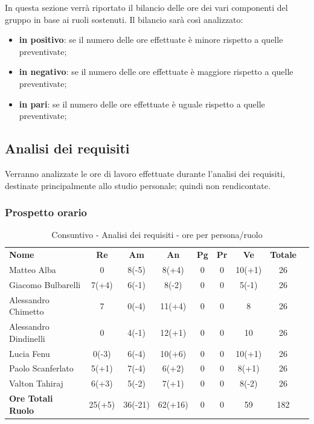 
In questa sezione verrà riportato il bilancio delle ore dei vari componenti del gruppo in base ai ruoli sostenuti. Il bilancio sarà così analizzato:
\begin{itemize}
	\item {\bfseries in positivo}: se il numero delle ore effettuate è minore rispetto a quelle preventivate;
	\item {\bfseries in negativo}: se il numero delle ore effettuate è maggiore rispetto a quelle preventivate;
	\item {\bfseries in pari}: se il numero delle ore effettuate è uguale rispetto a quelle preventivate; \\
\end{itemize}

\subsection {Analisi dei requisiti}
Verranno analizzate le ore di lavoro effettuate durante l'analisi dei requisiti, destinate principalmente allo studio personale; quindi non rendicontate.
\subsubsection{Prospetto orario}
	\begin{table} [h!]
	\begin{center}
		\begin{tabular} { m{6 cm} c c c c c c c c }
			\rowcolor{lightgray}
			\textbf{Nome} & \textbf{Re} & \textbf{Am} & \textbf{An} & \textbf{Pg} &\textbf{Pr} & \textbf{Ve} & \textbf{Totale} \\ 
			Matteo Alba & 0 & 8(-5) &8(+4) & 0 & 0 & 10(+1) & 26  \\ 
			Giacomo Bulbarelli & 7(+4) & 6(-1) & 8(-2) & 0 & 0 & 5(-1) & 26 \\ 
			Alessandro Chimetto & 7 & 0(-4) & 11(+4) & 0 & 0 & 8 & 26 \\
			Alessandro Dindinelli & 0 & 4(-1) & 12(+1) & 0 & 0 & 10 & 26 \\
			Lucia Fenu & 0(-3) & 6(-4) & 10(+6) & 0 & 0 & 10(+1) & 26 \\
			Paolo Scanferlato & 5(+1) & 7(-4) & 6(+2) & 0 & 0 & 8(+1) & 26 \\
			Valton Tahiraj & 6(+3) & 5(-2) &7(+1) & 0 & 0 & 8(-2) & 26 \\
			\textbf{Ore Totali Ruolo} & 25(+5) & 36(-21) & 62(+16) & 0 & 0 & 59 & 182\\
		
		\end{tabular}
		\caption{Consuntivo - Analisi dei requisiti - ore per persona/ruolo}
	\end{center}
\end{table}

